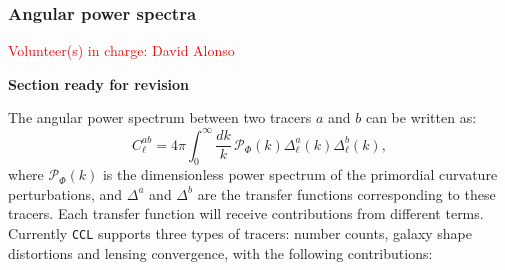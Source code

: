 \documentclass[\docopts]{\docclass}
\newcommand{\vol}[1]{\textcolor{red}{Volunteer(s) in charge: #1}}
\newcommand{\revise}{\textcolor{red!55!blue}{\bf Section ready for revision}}
\newcommand{\ccl}{{\tt CCL}\xspace}
\begin{document}
\subsubsection{Angular power spectra}\label{sssec:2pt.pspec}
\vol{David Alonso}

\revise

The angular power spectrum between two tracers $a$ and $b$ can be written as:
\begin{equation}
  C^{ab}_\ell=4\pi\int_0^\infty \frac{dk}{k}\,\mathcal{P}_\Phi(k)\Delta^a_\ell(k)\Delta^b_\ell(k),
\end{equation}
where $\mathcal{P}_\Phi(k)$ is the dimensionless power spectrum of the primordial curvature perturbations, and $\Delta^a$ and $\Delta^b$ are the transfer functions corresponding to these tracers. Each transfer function will receive contributions from different terms. Currently \ccl supports three types of tracers: number counts, galaxy shape distortions and lensing convergence, with the following contributions:
\end{document}
